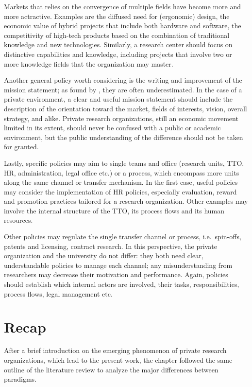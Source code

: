 Markets that relies on the convergence of multiple fields have become more and more actractive. Examples are the diffused need for (ergonomic) design, the economic value of hybrid projects that include both hardware and software, the competitivity of high-tech products based on the combination of traditional knowledge and new technologies. Similarly, a research center should focus on distinctive capabilities and knowledge, including projects that involve two or more knowledge fields that the organization may master. 
 
Another general policy worth considering is the writing and improvement of the mission statement; as found by \citet{Fitzgerald2015}, they are often underestimated. In the case of a private environment, a clear and useful mission statement should include the description of the orientation toward the market, fields of interests, vision, overall strategy, and alike. Private research organizations, still an economic movement limited in its extent, should never be confused with a public or academic environment, but the public understanding of the difference should not be taken for granted. 

Lastly, specific policies may aim to single teams and office (research units, TTO, HR, administration, legal office etc.) or a process, which encompass more units along the same channel or transfer mechanism. In the first case, useful policies may consider the implementation of HR policies, especially evaluation, reward and promotion practices tailored for a research organization. Other examples may involve the internal structure of the TTO, its process flows and its human resources.

Other policies may regulate the single transfer channel or process, i.e.\ spin-offs, patents and licensing, contract research. In this perspective, the private organization and the university do not differ: they both need clear, understandable policies to manage each channel; any misunderstanding from researchers may decrease their motivation and performance. Again, policies should establish which internal actors are involved, their tasks, responsibilities, process flows, legal management etc.

\section{Recap}

After a brief introduction on the emerging phenomenon of private research organizations, which lead to the present work, the chapter followed the same outline of the literature review to analyze the major differences between paradigms.

